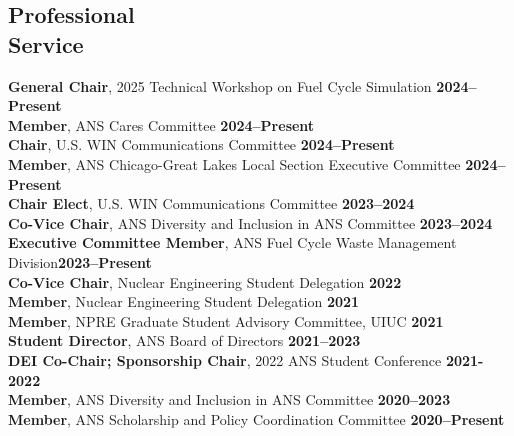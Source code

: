 \documentclass[margin,line]{resume}
\begin{document}
\begin{resume}
    \section{\mysidestyle Professional\\Service}
        \textbf{General Chair}, 2025 Technical Workshop on Fuel Cycle Simulation \hfill \textbf{2024--Present}\\
        \textbf{Member}, ANS Cares Committee \hfill \textbf{2024--Present} \\
        \textbf{Chair}, U.S. WIN Communications Committee \hfill \textbf{2024--Present} \\
        \textbf{Member}, ANS Chicago-Great Lakes Local Section Executive Committee \hfill \textbf{2024--Present}\vspace{0.5mm}\\
        \textbf{Chair Elect}, U.S. WIN Communications Committee \hfill \textbf{2023--2024}\vspace{0.5mm}\\
        \textbf{Co-Vice Chair}, ANS Diversity and Inclusion in ANS Committee \hfill \textbf{2023--2024}\vspace{0.5mm}\\
        \textbf{Executive Committee Member}, ANS Fuel Cycle Waste Management Division\hfill \textbf{2023--Present}\vspace{0.5mm}\\
        \textbf{Co-Vice Chair}, Nuclear Engineering Student Delegation \hfill \textbf{2022}\vspace{0.5mm}\\
        \textbf{Member}, Nuclear Engineering Student Delegation \hfill \textbf{2021}\vspace{0.5mm}\\
        \textbf{Member}, NPRE Graduate Student Advisory Committee, UIUC \hfill \textbf{2021}\vspace{0.5mm}\\
        \textbf{Student Director}, ANS Board of Directors \hfill \textbf{2021--2023}\vspace{.5mm}\\
        \textbf{DEI Co-Chair; Sponsorship Chair}, 2022 ANS Student Conference  \hfill \textbf{2021-2022}\vspace{0.5mm}\\
        \textbf{Member}, ANS Diversity and Inclusion in ANS Committee  \hfill \textbf{2020--2023}\vspace{.5mm}\\%
        \textbf{Member}, ANS Scholarship and Policy Coordination Committee  \hfill \textbf{2020--Present}\vspace{.5mm}\\%

\end{resume}
\end{document}
